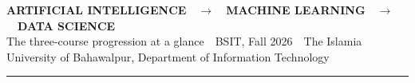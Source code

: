 \documentclass[11pt]{article}
\begin{document}
\begin{center}
{\large\bfseries\color{aihue}ARTIFICIAL INTELLIGENCE}\ \
{\color{neutral}$\longrightarrow$}\ \
{\large\bfseries\color{mlhue}MACHINE LEARNING}\ \
{\color{neutral}$\longrightarrow$}\ \
{\large\bfseries\color{dshue}DATA SCIENCE}\\[2pt]
{\footnotesize\color{sub}The three-course progression at a glance\ \textbullet\
BSIT, Fall 2026\ \textbullet\ The Islamia University of Bahawalpur,
Department of Information Technology}\\[2pt]
{\color{secondary}\rule{\linewidth}{1.1pt}}
\end{center}

\vspace{-1pt}
\end{document}
